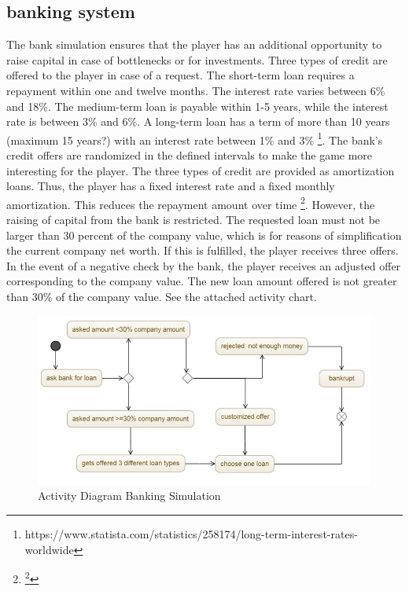 \subsection{banking system}
The bank simulation ensures that the player has an additional opportunity to raise capital in case of bottlenecks or for investments. Three types of credit are offered to the player in case of a request. 
The short-term loan requires a repayment within one and twelve months. The interest rate varies between 6\% and 18\%. The medium-term loan is payable within 1-5 years, while the interest rate is between 3\% and 6\%. A long-term loan has a term of more than 10 years (maximum 15 years?) with an interest rate between 1\% and 3\% \footnote{https://www.statista.com/statistics/258174/long-term-interest-rates-worldwide}. The bank's credit offers are randomized in the defined intervals to make the game more interesting for the player. The three types of credit are provided as amortization loans. Thus, the player has a fixed interest rate and a fixed monthly amortization. This reduces the repayment amount over time \footnote{\footnote{https://www.investopedia.com/terms/a/amortized\_loan.asp}}.
However, the raising of capital from the bank is restricted.
The requested loan must not be larger than 30 percent of the company value, which is for reasons of simplification the current company net worth. If this is fulfilled, the player receives three offers. In the event of a negative check by the bank, the player receives an adjusted offer corresponding to the company value. The new loan amount offered is not greater than 30\% of the company value. See the attached activity chart. 

\begin{figure}
	\centering
	\includegraphics[width=12cm]{images/banking_activity_diagram.jpg}
	\caption{Activity Diagram Banking Simulation}
	\label{jpg:banking}
\end{figure}

